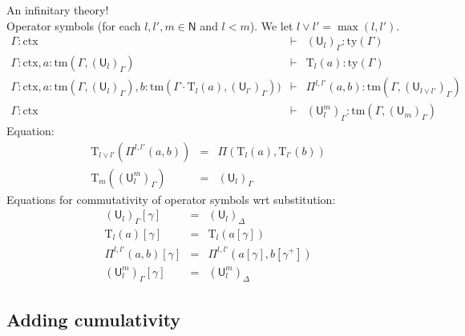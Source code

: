 \documentclass[11pt,a4paper]{article}
\theoremstyle{definition}
\newcommand{\NN}{\mathsf{N}}
\newcommand{\UU}{\mathsf{U}}
\def\NN{\mathsf{N}}
\def\UU{\mathsf{U}}
\newcommand{\N}{\mathsf{N}}
\def\Pihat{\Pi}
\newcommand{\ctx}{\mathrm{ctx}}
\newcommand{\ty}{\mathrm{ty}}
\newcommand{\tm}{\mathrm{tm}}
\def\U{\mathsf{U}}
\newcommand{\Ta}{\mathrm{T}}
\begin{document}
\begin{tiny}
An infinitary theory!
\\
\vspace{1ex}
Operator symbols (for each $l, l', m\in \NN$ and $l < m$). We let $l \vee l' = \max(l,l')$.
\begin{eqnarray*}
\Gamma : \ctx &\vdash& (\U_{l})_\Gamma : \ty(\Gamma)\\
\Gamma : \ctx, a : \tm(\Gamma,(\U_{l})_\Gamma) &\vdash& {\Ta_{l}}(a) : \ty(\Gamma)\\
\Gamma : \ctx,
a : \tm(\Gamma,(\U_{l})_\Gamma),
b :  \tm(\Gamma \cdot \Ta_{l}(a), (\U_{l'})_\Gamma))
&\vdash&
 \Pihat^{l,l'}(a,b) : \tm(\Gamma,(\U_{l \vee l'})_\Gamma)\\
 \Gamma : \ctx&\vdash&(\UU^m_l)_\Gamma: \tm(\Gamma,(\UU_{m})_\Gamma)
\end{eqnarray*}
Equation:
\begin{eqnarray*}
\Ta_{l \vee l'}(\Pi^{l,l'}(a,b)) &=& \Pi(\Ta_l(a),\Ta_{l'}(b))\\
\Ta_{m}((\UU^m_l)_\Gamma) &=& (\UU_l)_\Gamma
\end{eqnarray*}
 Equations for commutativity of operator symbols wrt substitution:
 \begin{eqnarray*}
(\U_l)_\Gamma [ \gamma ] &=& (\U_l)_\Delta\\
\Ta_l(a) [ \gamma ] &=& \Ta_l(a[ \gamma ] )\\
\Pi^{l,l'}(a,b)[ \gamma ] &=& \Pi^{l,l'}(a [ \gamma ], b[ \gamma^+ ])\\
(\UU^m_l)_\Gamma[ \gamma ] &=&(\UU^m_l)_\Delta
\end{eqnarray*}
\end{tiny}

\subsection{Adding cumulativity}
\end{document}
